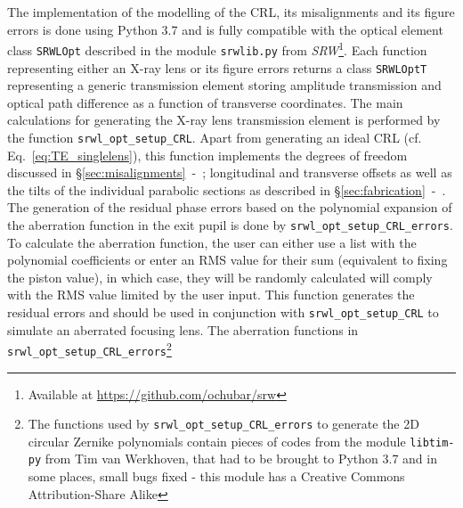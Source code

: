 \begin{refsection}
The implementation of the modelling of the CRL, its misalignments and its figure errors is done using Python 3.7 and is fully compatible with the optical element class \texttt{SRWLOpt} described in the module \texttt{srwlib.py} from \textit{SRW}\footnote{Available at \url{https://github.com/ochubar/srw}}. Each function representing either an X-ray lens or its figure errors returns a class \texttt{SRWLOptT} representing a generic transmission element storing amplitude transmission and optical path difference as a function of transverse coordinates. The main calculations for generating the X-ray lens transmission element is performed by the function \texttt{srwl\_opt\_setup\_CRL}. Apart from generating an ideal CRL (cf. Eq.~\ref{eq:TE_singlelens}), this function implements the degrees of freedom discussed in \S\ref{sec:misalignments}~-~\textit{}; longitudinal and transverse offsets as well as the tilts of the individual parabolic sections as described in \S\ref{sec:fabrication}~-~\textit{}. The generation of the residual phase errors based on the polynomial expansion of the aberration function in the exit pupil is done by \texttt{srwl\_opt\_setup\_CRL\_errors}. To calculate the aberration function, the user can either use a list with the polynomial coefficients or enter an RMS value for their sum (equivalent to fixing the piston value), in which case, they will be randomly calculated will comply with the RMS value limited by the user input. This function generates the residual errors and should be used in conjunction with \texttt{srwl\_opt\_setup\_CRL} to simulate an aberrated focusing lens. The aberration functions in \texttt{srwl\_opt\_setup\_CRL\_errors}\footnote{The functions used by \texttt{srwl\_opt\_setup\_CRL\_errors} to generate the 2D circular Zernike polynomials contain pieces of codes from the module \texttt{libtim-py} from Tim van Werkhoven, that had to be brought to Python 3.7 and in some places, small bugs fixed - this module has a Creative Commons Attribution-Share Alike
}
\end{refsection}
